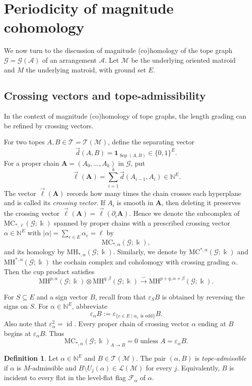 \documentclass[10pt]{amsart}
\theoremstyle{plain}
\theoremstyle{definition}
\newtheorem{definition}[theorem]{Definition}
\newcommand{\one}{\mathbf{1}}
\newcommand{\NN}{\mathbb{N}}
\newcommand{\A}{\mathcal{A}}
\newcommand{\T}{\mathcal{T}}
\newcommand{\F}{\mathcal{F}}
\newcommand{\G}{\mathcal{G}}
\DeclareMathOperator{\id}{id}
\newcommand{\MC}{\mathrm{MC}}
\newcommand{\MH}{\mathrm{MH}}
\newcommand{\M}{\mathcal{M}}
\newcommand{\Lcov}{\mathcal{L}}
\newcommand{\Sep}{\operatorname{Sep}}
\newcommand{\eps}{\varepsilon}
\newcommand{\kk}{\Bbbk}
\newcommand{\bA}{\boldsymbol{A}}
\begin{document}
\section{Periodicity of magnitude cohomology}\label{periodicty-section}

We now turn to the discussion of magnitude (co)homology of the tope graph $\G=\G(\A)$ of an arrangement $\A$. Let $\M$ be the underlying oriented matroid and $M$ the underlying matroid, with ground set $E$.

\subsection{Crossing vectors and tope-admissibility}

In the context of magnitude (co)homology of tope graphs, the length grading can be refined by crossing vectors.

For two topes $A,B\in\T=\T(\M)$, define the separating vector
\[
\vec{d}(A,B)=\one_{\Sep(A,B)}\in\{0,1\}^E.
\]
For a proper chain $\bA=(A_0,\ldots,A_k)$ in $\G$, put
\[
\vec{\ell}(\bA)=\sum_{i=1}^k\vec{d}(A_{i-1},A_i)\in\NN^E.
\]
The vector $\vec{\ell}(\bA)$ records how many times the chain crosses each hyperplane and is called its \emph{crossing vector}. If $A_i$ is smooth in $\bA$, then deleting it preserves the crossing vector $\vec{\ell}(\bA)=\vec{\ell}(\partial_i\bA)$. Hence we denote the subcomplex of $\MC_{*,\ell}(\G;\kk)$ spanned by proper chains with a prescribed crossing vector $\alpha\in\NN^E$ with $|\alpha|=\sum_{e\in E}\alpha_e=\ell$ by
\[
\MC_{*,\alpha}(\G;\kk),
\]
and its homology by $\MH_{*,\alpha}(\G;\kk)$. Similarly, we denote by $\MC^{*,\alpha}(\G;\kk)$ and $\MH^{*,\alpha}(\G;\kk)$ the cochain complex and coholomogy with crossing grading $\alpha$. Then the cup product satisfies
\[
\MH^{p,\alpha}(\G;\kk)\otimes\MH^{q,\beta}(\G;\kk)\xrightarrow{\smile}\MH^{p+q,\alpha+\beta}(\G;\kk).
\]

For $S\subseteq E$ and a sign vector $B$, recall from  that $\eps_SB$ is obtained by reversing the signs on $S$. For $\alpha\in\NN^E$, abbreviate
\[
\eps_\alpha B:=\eps_{\{e\in E\mid \alpha_e\text{ is odd}\}}B.
\]
Also note that $\eps_{\alpha}^2=\id$. Every proper chain of crossing vector $\alpha$ ending at $B$ begins at $\eps_\alpha B$. Thus
\[
\MC_{*,\alpha}(\G;\kk)_{A\to B}=0 \text{ unless } A=\eps_\alpha B.
\]

\begin{definition}
Let $\alpha\in\NN^E$ and $B\in\T(\M)$. The pair $(\alpha,B)$ is \emph{tope-admissible} if $\alpha$ is $M$-admissible and $B\setminus U_j(\alpha)\in\Lcov(\M)$ for every $j$. Equivalently, $B$ is incident to every flat in the level-flat flag $\F_\alpha$ of $\alpha$.
\end{definition}
\end{document}
